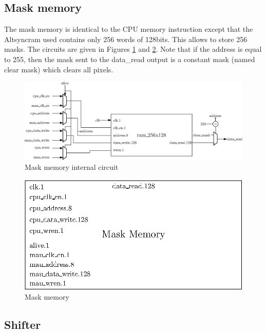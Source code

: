 \subsection{Mask memory}

The mask memory is identical to the CPU memory instruction except that the Altsyncram used contains 
only 256 words of 128bits. This allows to store 256 masks. The circuits are given in Figures
\ref{fig:gpu/mask_memory_in} and \ref{fig:gpu/mask_memory}. Note that if the address is equal to
255, then the mask sent to the data\_read output is a constant mask (named clear mask) which 
clears all pixels.

\begin{figure}[H]
    \centering
    \includegraphics[width=\linewidth]{Chapter4-GPU_CLKU/res/mask_memory_in}
    \caption{Mask memory internal circuit}
    \label{fig:gpu/mask_memory_in}
\end{figure}

\begin{figure}[H]
    \centering
    \includegraphics[scale=0.8]{Chapter4-GPU_CLKU/res/mask_memory}
    \caption{Mask memory}
    \label{fig:gpu/mask_memory}
\end{figure}

\subsection{Shifter}

